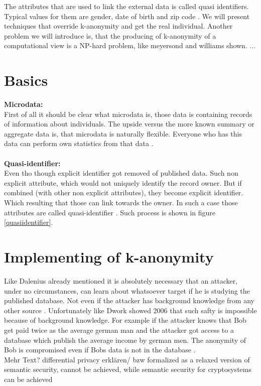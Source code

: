 \documentclass{llncs}
\begin{document}
The attributes that are used to link the external data is called quasi identifiers. Typical values for them are gender, date of birth and zip code \cite{ldiversity}. 
We will present techniques that override k-anonymity and get the real individual. Another problem we will introduce is, that the producing of k-anonymity of a computational view is a NP-hard problem, like  meyersond and williams shown.
...
\newpage
\section{Basics}
\textbf{Microdata:}\\
First of all it should be clear what microdata is, those data is containing records of information about individuals. The upside versus the more known summary or aggregate data is, that microdata is naturally  flexible. Everyone who has this data can perform own statistics from that data \cite{microdataweb}.\\
\\
\textbf{Quasi-identifier:}\\
Even tho though explicit identifier got removed of published data. Such non explicit attribute, which would not uniquely identify the record owner. But if combined (with other non explicit attributes), they become explicit identifier. Which resulting that those can link towards the owner. In such a case those attributes are called quasi-identifier \cite{dalenius1986finding}. Such process is shown in figure \ref{quasiidentifier}. 


\section{Implementing of k-anonymity}

Like Dalenius already mentioned it is absolutely necessary that an attacker, under no circumstances, can learn about whatsoever target if he is studying the published database. Not even if the attacker has background knowledge from any other source  \cite{Dalenius1977}. Unfortunately like Dwork showed 2006 that such safty is impossible because of background knowledge. For example if the attacker knows that Bob get paid twice as the average german man and the attacker got access to a database which publish the average income by german men. The anonymity of Bob is compromised even if Bobs data is not in the database \cite{dwork2011differential}.  
\newline \\ Mehr Text? differential privacy erklären/ bzw formalized as a relaxed version of semantic security, cannot be achieved, while semantic security for cryptosystems can be achieved
\end{document}
